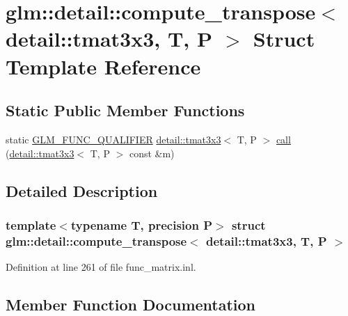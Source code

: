 \hypertarget{structglm_1_1detail_1_1compute__transpose_3_01detail_1_1tmat3x3_00_01_t_00_01_p_01_4}{}\section{glm\+:\+:detail\+:\+:compute\+\_\+transpose$<$ detail\+:\+:tmat3x3, T, P $>$ Struct Template Reference}
\label{structglm_1_1detail_1_1compute__transpose_3_01detail_1_1tmat3x3_00_01_t_00_01_p_01_4}
\subsection*{Static Public Member Functions}
\begin{DoxyCompactItemize}
\item 
static \hyperlink{setup_8hpp_a33fdea6f91c5f834105f7415e2a64407}{G\+L\+M\+\_\+\+F\+U\+N\+C\+\_\+\+Q\+U\+A\+L\+I\+F\+I\+ER} \hyperlink{structglm_1_1detail_1_1tmat3x3}{detail\+::tmat3x3}$<$ T, P $>$ \hyperlink{structglm_1_1detail_1_1compute__transpose_3_01detail_1_1tmat3x3_00_01_t_00_01_p_01_4_aeb6e3f561dc927d220808c5267b65149}{call} (\hyperlink{structglm_1_1detail_1_1tmat3x3}{detail\+::tmat3x3}$<$ T, P $>$ const \&m)
\end{DoxyCompactItemize}


\subsection{Detailed Description}
\subsubsection*{template$<$typename T, precision P$>$\newline
struct glm\+::detail\+::compute\+\_\+transpose$<$ detail\+::tmat3x3, T, P $>$}



Definition at line 261 of file func\+\_\+matrix.\+inl.



\subsection{Member Function Documentation}
\mbox{\label{structglm_1_1detail_1_1compute__transpose_3_01detail_1_1tmat3x3_00_01_t_00_01_p_01_4_aeb6e3f561dc927d220808c5267b65149}} 
